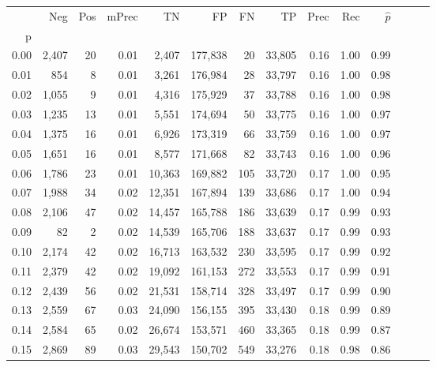 \begin{tabular}{rrrrrrrrrrrrrr}
\toprule
{} &    Neg &  Pos & mPrec &       TN &       FP &      FN &      TP &  Prec &   Rec & $\hat{p}$ \\
p    &        &      &       &          &          &         &         &       &       &           \\
\midrule
0.00 &  2,407 &   20 &  0.01 &    2,407 &  177,838 &      20 &  33,805 &  0.16 &  1.00 &      0.99 \\
0.01 &    854 &    8 &  0.01 &    3,261 &  176,984 &      28 &  33,797 &  0.16 &  1.00 &      0.98 \\
0.02 &  1,055 &    9 &  0.01 &    4,316 &  175,929 &      37 &  33,788 &  0.16 &  1.00 &      0.98 \\
0.03 &  1,235 &   13 &  0.01 &    5,551 &  174,694 &      50 &  33,775 &  0.16 &  1.00 &      0.97 \\
0.04 &  1,375 &   16 &  0.01 &    6,926 &  173,319 &      66 &  33,759 &  0.16 &  1.00 &      0.97 \\
0.05 &  1,651 &   16 &  0.01 &    8,577 &  171,668 &      82 &  33,743 &  0.16 &  1.00 &      0.96 \\
0.06 &  1,786 &   23 &  0.01 &   10,363 &  169,882 &     105 &  33,720 &  0.17 &  1.00 &      0.95 \\
0.07 &  1,988 &   34 &  0.02 &   12,351 &  167,894 &     139 &  33,686 &  0.17 &  1.00 &      0.94 \\
0.08 &  2,106 &   47 &  0.02 &   14,457 &  165,788 &     186 &  33,639 &  0.17 &  0.99 &      0.93 \\
0.09 &     82 &    2 &  0.02 &   14,539 &  165,706 &     188 &  33,637 &  0.17 &  0.99 &      0.93 \\
0.10 &  2,174 &   42 &  0.02 &   16,713 &  163,532 &     230 &  33,595 &  0.17 &  0.99 &      0.92 \\
0.11 &  2,379 &   42 &  0.02 &   19,092 &  161,153 &     272 &  33,553 &  0.17 &  0.99 &      0.91 \\
0.12 &  2,439 &   56 &  0.02 &   21,531 &  158,714 &     328 &  33,497 &  0.17 &  0.99 &      0.90 \\
0.13 &  2,559 &   67 &  0.03 &   24,090 &  156,155 &     395 &  33,430 &  0.18 &  0.99 &      0.89 \\
0.14 &  2,584 &   65 &  0.02 &   26,674 &  153,571 &     460 &  33,365 &  0.18 &  0.99 &      0.87 \\
0.15 &  2,869 &   89 &  0.03 &   29,543 &  150,702 &     549 &  33,276 &  0.18 &  0.98 &      0.86 \\

\end{tabular}
